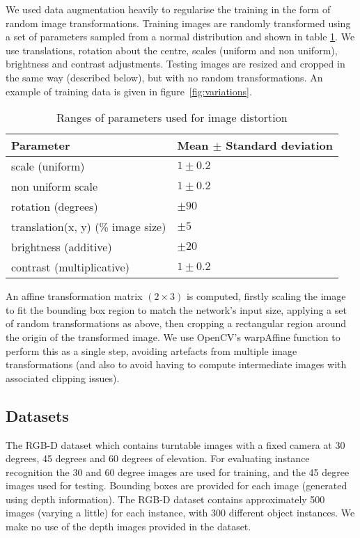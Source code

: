 We used data augmentation heavily to regularise the training in the form of random image transformations. Training images are randomly transformed using a set of parameters sampled from a normal distribution and shown in table \ref{fig:jitter}.  We use translations, rotation about the centre, scales (uniform and non uniform), brightness and contrast adjustments. Testing images are resized and cropped in the same way (described below), but with no random transformations. An example of training data is given in figure~\ref{fig:variations}.

\begin{table}[h]
  \centering
    \caption{Ranges of parameters used for image distortion }
    
  \begin{tabular}{ l  l }
    Parameter & Mean $ \pm $ Standard deviation \\
    \toprule
    scale (uniform) & $ 1 \pm 0.2 $  \\ 
    non uniform scale  & $ 1 \pm 0.2 $  \\ 
    rotation (degrees) & $ \pm 90 $ \\ 
    translation(x, y) (\% image size) & $ \pm 5 $ \\ 
    brightness (additive) & $ \pm 20 $ \\ 
    contrast (multiplicative) & $ 1 \pm 0.2 $ \\ 
    \bottomrule
  \end{tabular}
\label{fig:jitter}
\end{table}


An affine transformation matrix $ (2 \times 3) $ is computed, firstly scaling the image to fit the bounding box region to match the network's input size, applying a set of random transformations as above, then cropping a rectangular region around the origin of the transformed image. We use OpenCV's warpAffine function to perform this as a single step, avoiding artefacts from multiple image transformations (and also to avoid having to compute intermediate images with associated clipping issues).

\subsection{Datasets}

The RGB-D \cite{Lai2011} dataset which contains turntable images with a fixed camera at 30 degrees, 45 degrees and 60 degrees of elevation. For evaluating instance recognition the 30 and 60 degree images are used for training, and the 45 degree images used for testing. Bounding boxes are provided for each image (generated using depth information). The RGB-D dataset contains approximately 500 images (varying a little) for each instance, with 300 different object instances. We make no use of the depth images provided in the dataset.

